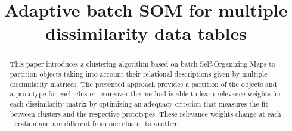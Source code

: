 \documentclass[10pt, conference, compsocconf]{IEEEtran}
\begin{document}
%
\title{Adaptive batch SOM for multiple dissimilarity data tables}





% 
\author{

}


\maketitle


\begin{abstract}
This paper introduces a clustering algorithm based on batch Self-Organizing Maps to partition objects taking into account their relational descriptions given by multiple dissimilarity matrices. 
The presented approach provides a partition of the objects and a prototype for each cluster, moreover the method is able to learn relevance weights for each dissimilarity matrix by optimizing an adequacy criterion that measures the fit between clusters and the respective prototypes. These relevance weights change at each iteration and are different from one cluster to another.

\end{abstract}
\end{document}
